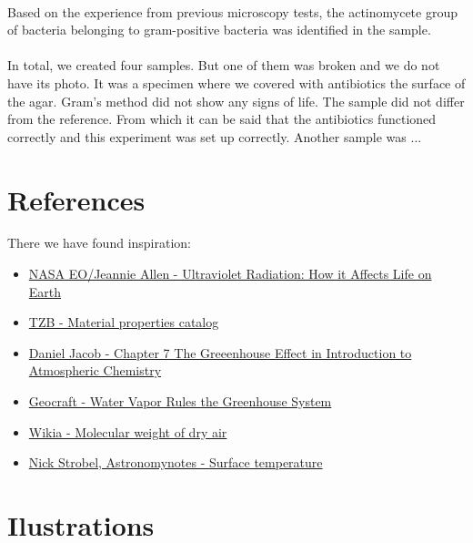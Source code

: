 \documentclass{aa}
\begin{document}
\paragraph{}
Based on the experience from previous microscopy tests, the actinomycete group of bacteria belonging to gram-positive bacteria was identified in the sample.
\paragraph{}
In total, we created four samples. But one of them was broken and we do not have its photo. It was a specimen where we covered with antibiotics the surface of the agar. Gram's method did not show any signs of life. The sample did not differ from the reference. From which it can be said that the antibiotics functioned correctly and this experiment was set up correctly. Another sample was ...
\section{References}
There we have found inspiration:
\begin{itemize}
\item\href{https://earthobservatory.nasa.gov/Features/UVB/}{NASA EO/Jeannie Allen - Ultraviolet Radiation: How it Affects Life on Earth}
\\
\item\href{https://stavba.tzb-info.cz/docu/tabulky/0000/000086_katalog.html}{TZB - Material properties catalog}
\\
\item\href{http://acmg.seas.harvard.edu/people/faculty/djj/book/bookchap7.html}{Daniel Jacob - Chapter 7 The Greeenhouse Effect in Introduction to Atmospheric Chemistry}
\\
\item\href{http://www.geocraft.com/WVFossils/greenhouse_data.html} {Geocraft - Water Vapor Rules
the Greenhouse System}
\\
\item\href{http://renewableenergy.wikia.com/wiki/Molecular_weight_of_dry_air} {Wikia - Molecular weight of dry air}
\\
\item\href{http://www.astronomynotes.com/solarsys/s3c.htm} {Nick Strobel, Astronomynotes - Surface temperature}
\end{itemize}
\section{Ilustrations}
\listoffigures
\end{document}
